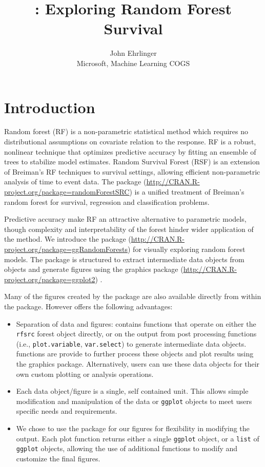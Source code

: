 \documentclass[article]{jss}
\author{
John Ehrlinger\\Microsoft, Machine Learning COGS
}
\title{\pkg{ggRandomForests}: Exploring Random Forest Survival}
\begin{document}
\section{Introduction}\label{introduction}

Random forest \citep{Breiman:2001} (RF) is a non-parametric statistical
method which requires no distributional assumptions on covariate
relation to the response. RF is a robust, nonlinear technique that
optimizes predictive accuracy by fitting an ensemble of trees to
stabilize model estimates. Random Survival Forest (RSF)
\citep{Ishwaran:2007a, Ishwaran:2008} is an extension of Breiman's RF
techniques to survival settings, allowing efficient non-parametric
analysis of time to event data. The  package
(\url{http://CRAN.R-project.org/package=randomForestSRC})
\citep{Ishwaran:RFSRC:2014} is a unified treatment of Breiman's random
forest for survival, regression and classification problems.

Predictive accuracy make RF an attractive alternative to parametric
models, though complexity and interpretability of the forest hinder
wider application of the method. We introduce the 
package (\url{http://CRAN.R-project.org/package=ggRandomForests}) for
visually exploring random forest models. The 
package is structured to extract intermediate data objects from
 objects and generate figures using the
 graphics package
(\url{http://CRAN.R-project.org/package=ggplot2}) \citep{Wickham:2009}.

Many of the figures created by the  package are
also available directly from within the  package.
However  offers the following advantages:

\begin{itemize}
\item
  Separation of data and figures:  contains
  functions that operate on either the \texttt{rfsrc} forest object
  directly, or on the output from  post processing
  functions (i.e., \texttt{plot.variable}, \texttt{var.select}) to
  generate intermediate  data objects.
   functions are provide to further process these
  objects and plot results using the  graphics package.
  Alternatively, users can use these data objects for their own custom
  plotting or analysis operations.
\item
  Each data object/figure is a single, self contained unit. This allows
  simple modification and manipulation of the data or \texttt{ggplot}
  objects to meet users specific needs and requirements.
\item
  We chose to use the  package for our figures for
  flexibility in modifying the output. Each  plot
  function returns either a single \texttt{ggplot} object, or a
  \texttt{list} of \texttt{ggplot} objects, allowing the use of
  additional  functions to modify and customize the final
  figures.
\end{itemize}
\end{document}
